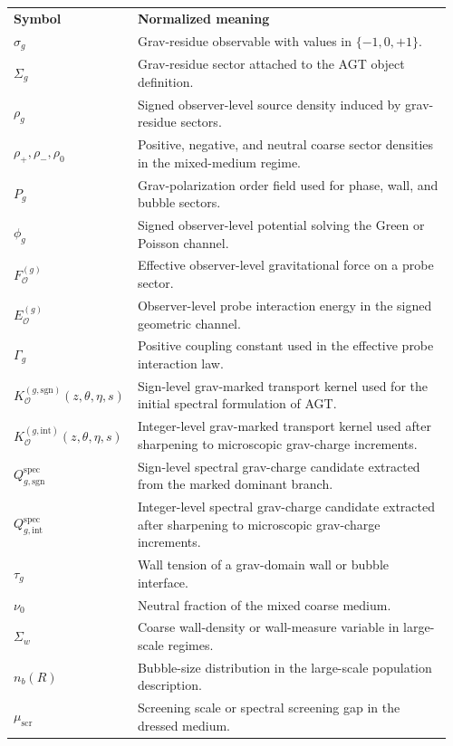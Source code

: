 \begin{longtable}{@{}L{0.18\linewidth}L{0.78\linewidth}@{}}
\textbf{Symbol} & \textbf{Normalized meaning} \\
$\sigma_g$ & Grav-residue observable with values in $\{-1,0,+1\}$. \\
$\Sigma_g$ & Grav-residue sector attached to the AGT object definition. \\
$\rho_g$ & Signed observer-level source density induced by grav-residue sectors. \\
$\rho_+,\rho_-,\rho_0$ & Positive, negative, and neutral coarse sector densities in the mixed-medium regime. \\
$P_g$ & Grav-polarization order field used for phase, wall, and bubble sectors. \\
$\phi_g$ & Signed observer-level potential solving the Green or Poisson channel. \\
$F^{(g)}_{\mathcal O}$ & Effective observer-level gravitational force on a probe sector. \\
$E^{(g)}_{\mathcal O}$ & Observer-level probe interaction energy in the signed geometric channel. \\
$\Gamma_g$ & Positive coupling constant used in the effective probe interaction law. \\
$K^{(g,\mathrm{sgn})}_{\mathcal O}(z,\theta,\eta,s)$ & Sign-level grav-marked transport kernel used for the initial spectral formulation of AGT. \\
$K^{(g,\mathrm{int})}_{\mathcal O}(z,\theta,\eta,s)$ & Integer-level grav-marked transport kernel used after sharpening to microscopic grav-charge increments. \\
$Q^{\mathrm{spec}}_{g,\mathrm{sgn}}$ & Sign-level spectral grav-charge candidate extracted from the marked dominant branch. \\
$Q^{\mathrm{spec}}_{g,\mathrm{int}}$ & Integer-level spectral grav-charge candidate extracted after sharpening to microscopic grav-charge increments. \\
$\tau_g$ & Wall tension of a grav-domain wall or bubble interface. \\
$\nu_0$ & Neutral fraction of the mixed coarse medium. \\
$\Sigma_w$ & Coarse wall-density or wall-measure variable in large-scale regimes. \\
$n_b(R)$ & Bubble-size distribution in the large-scale population description. \\
$\mu_{\mathrm{scr}}$ & Screening scale or spectral screening gap in the dressed medium. \\

\end{longtable}
